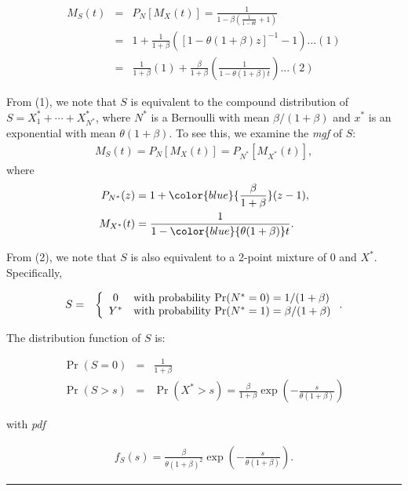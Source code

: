 \documentclass[]{book}
\theoremstyle{definition}
\theoremstyle{definition}
\theoremstyle{definition}
\theoremstyle{remark}
\begin{document}
\begin{eqnarray}
M_{S}(t) &=& P_N [M_{X}(t)] = \frac{1}{1 - \beta \left( \frac{1}{1-\theta t} + 1\right)} \nonumber\\
&=& 1+ \frac{1}{1+\beta} ([1-\theta(1+\beta)z]^{-1}-1)...(1)\\
&=& \frac{1}{1+\beta}(1) +\frac{\beta}{1+\beta}
\left( \frac{1}{1-\theta (1+\beta)t}\right)...(2)
\end{eqnarray}

From (1), we note that \(S\) is equivalent to the compound distribution
of \(S=X^{*}_1+\cdots+X^{*}_{N^{*}}\), where \(N^{*}\) is a Bernoulli
with mean \(\beta/(1+\beta)\) and \(x^{*}\) is an exponential with mean
\(\theta(1+\beta)\). To see this, we examine the \emph{mgf} of \(S\):
\[\begin{aligned}
M_{S}(t) = P_N [M_{X}(t)] = P_{N^{*}} [M_{X^{*}}(t)],
\end{aligned}\] where \[\begin{aligned}
P_{N^*} (z) &=1+ \color{blue}{\frac{\beta}{1+ \beta}} (z-1),\\
M_{X^*} (t) &=\frac{1}{1- {\color{blue}{\theta(1+\beta)}} t}.
\end{aligned}\]

From (2), we note that \(S\) is also equivalent to a 2-point mixture of
0 and \(X^{*}\). Specifically,

\begin{eqnarray*}
S &=&
\left\{
\begin{array}{cl}
0 & {\rm with~ probability ~Pr}(N^*=0) = 1/(1+\beta) \\
Y^{*} & {\rm with~ probability ~Pr}(N^*=1) = \beta/(1+\beta)
\end{array}
\right..
\end{eqnarray*}

The distribution function of \(S\) is:

\begin{eqnarray*}
\Pr(S=0) &=& \frac{1}{1+\beta}\\
\Pr(S>s) &=& \Pr(X^*>s) =\frac{\beta}{1+\beta} \exp\left( -\frac{s}{
\theta (1+\beta)}\right)
\end{eqnarray*}

with \emph{pdf}

\begin{eqnarray*}
f_{S}(s) = \frac{\beta}{\theta (1+\beta)^2}\exp\left( -\frac{s}{
\theta (1+\beta)}\right).
\end{eqnarray*}

\begin{center}\rule{0.5\linewidth}{\linethickness}\end{center}
\end{document}
